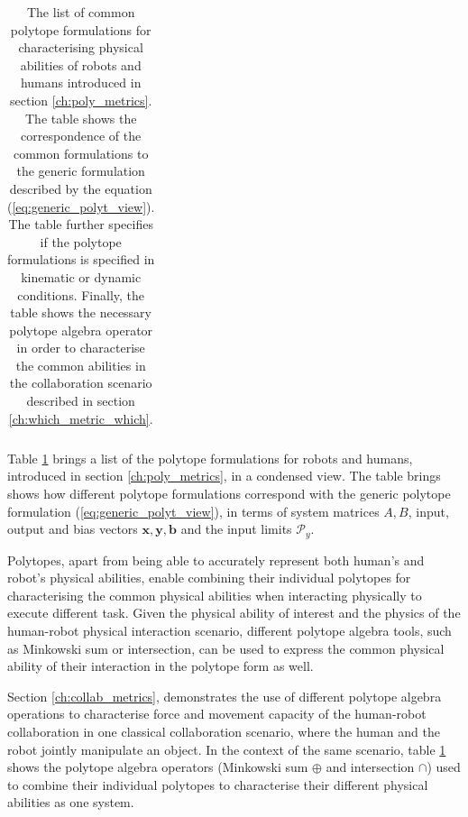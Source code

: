 \begin{table}[!b]
\begin{tabular}{|l|c|c|c|c|c|c|c|c|c|}
\hline
\end{tabular}
\caption{The list of common polytope formulations for characterising physical abilities of robots and humans introduced in section \ref{ch:poly_metrics}. The table shows the correspondence of the common formulations to the generic formulation described by the equation (\ref{eq:generic_polyt_view}). The table further specifies if the polytope formulations is specified in kinematic or dynamic conditions. Finally, the table shows the necessary polytope algebra operator in order to characterise the common abilities in the collaboration scenario described in section \ref{ch:which_metric_which}.}
\label{tab:merged_table}
\end{table}

Table \ref{tab:merged_table} brings a list of the polytope formulations for robots and humans, introduced in section \ref{ch:poly_metrics}, in a condensed view. The table brings shows how different polytope formulations correspond with the generic polytope formulation (\ref{eq:generic_polyt_view}), in terms of system matrices $A,B$, input, output and bias vectors $\bm{x},\bm{y},\bm{b}$ and the input limits $\mathcal{P}_y$.

Polytopes, apart from being able to accurately represent both human's and robot's physical abilities, enable combining their individual polytopes for characterising the common physical abilities when interacting physically to execute different task. Given the physical ability of interest and the physics of the human-robot physical interaction scenario, different polytope algebra tools, such as Minkowski sum or intersection, can be used to express the common physical ability of their interaction in the polytope form as well.


Section \ref{ch:collab_metrics}, demonstrates the use of different polytope algebra operations to characterise force and movement capacity of the human-robot collaboration in one classical collaboration scenario, where the human and the robot jointly manipulate an object. In the context of the same scenario, table \ref{tab:merged_table} shows the polytope algebra operators (Minkowski sum $\oplus$ and intersection $\cap$) used to combine their individual polytopes to characterise their different physical abilities as one system.


